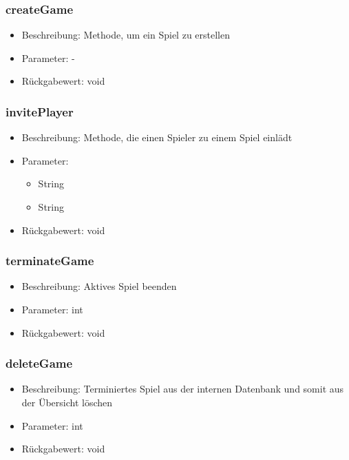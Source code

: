 \documentclass[a4paper]{scrreprt}
\begin{document}
	\subsubsection{createGame}
	\begin{itemize}
		\item Beschreibung: Methode, um ein Spiel zu erstellen
		\item Parameter: -
		\item Rückgabewert: void
	\end{itemize}
	\subsubsection{invitePlayer}
	\begin{itemize}
		\item Beschreibung: Methode, die einen Spieler zu einem Spiel einlädt
		\item Parameter:
		\begin{itemize}
			\item String
			\item String
		\end{itemize}
		\item Rückgabewert: void
	\end{itemize}
	\subsubsection{terminateGame}
	\begin{itemize}
		\item Beschreibung: Aktives Spiel beenden
		\item Parameter: int
		\item Rückgabewert: void
	\end{itemize}
	\subsubsection{deleteGame}
	\begin{itemize}
		\item Beschreibung: Terminiertes Spiel aus der internen Datenbank und somit aus der Übersicht löschen
		\item Parameter: int
		\item Rückgabewert: void
	\end{itemize}
\end{document}

